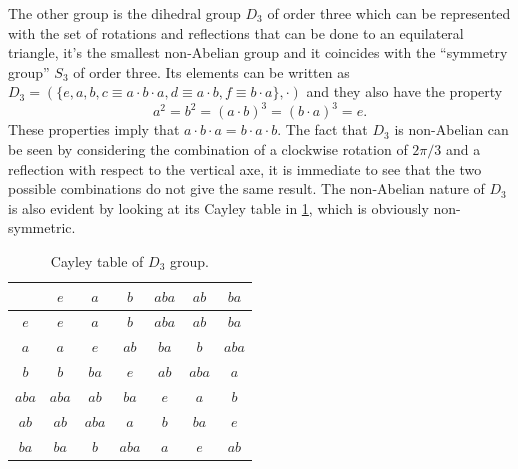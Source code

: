 The other group is the dihedral group $D_3$ of order three which can be represented with the set of rotations and reflections that can be done to an equilateral triangle, it's the smallest non-Abelian group and it coincides with the ``symmetry group'' $S_3$ of order three. Its elements can be written as $D_3 = (\{e,a,b,c \equiv a\cdot b\cdot a,d \equiv a\cdot b,f \equiv b\cdot a\},\cdot)$ and they also have the property 
\begin{equation}
    a^2  = b^2 = (a\cdot b)^3 = (b\cdot a)^3 = e.
\end{equation}
These properties imply that $a\cdot b\cdot a = b\cdot a\cdot b$. The fact that $D_3$ is non-Abelian can be seen by considering the combination of a clockwise rotation of $2\pi/3$ and a reflection with respect to the vertical axe, it is immediate to see that the two possible combinations do not give the same result. The non-Abelian nature of $D_3$ is also evident by looking at its Cayley table in \ref{tab: D3 Cayley table}, which is obviously non-symmetric.
\begin{table}[h]
    \centering
    \begin{tabular}{|c|cccccc|}
        \hline 
         & $e$ & $a$ & $b$ & $aba$ & $ab$ & $ba$ \\ \hline
         $e$   & $e$   & $a$   & $b$ & $aba$ & $ab$ & $ba$ \\ 
         $a$   & $a$   & $e$ & $ab$ & $ba$ & $b$ & $aba$ \\
         $b$ & $b$ & $ba$ & $e$ & $ab$ & $aba$ & $a$ \\ 
         $aba$ & $aba$ & $ab$ & $ba$ & $e$   & $a$   & $b$ \\ 
         $ab$ & $ab$ & $aba$ & $a$   & $b$   & $ba$ & $e$ \\ 
         $ba$ & $ba$ & $b$   & $aba$   & $a$ & $e$ & $ab$ \\ \hline
    \end{tabular}
    \caption{Cayley table of $D_3$ group.}
    \label{tab: D3 Cayley table}
\end{table}
